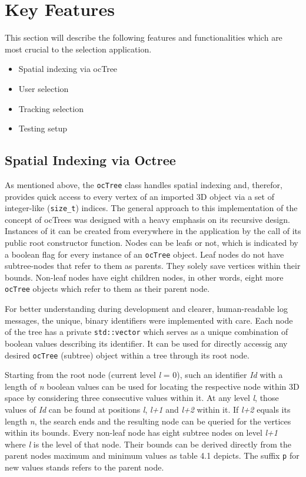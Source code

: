 \section{Key Features}
\label{sec:key_features}
This section will describe the following features and functionalities which are most crucial to the selection application.

\begin{itemize}  
	\item Spatial indexing via ocTree
	\item User selection
	\item Tracking selection
	\item Testing setup 
\end{itemize}

\subsection{Spatial Indexing via Octree}
\label{sec:spatial_indexing_via_octree}

As mentioned above, the \texttt{ocTree} class handles spatial indexing and, therefor, provides quick access to every vertex of an imported 3D object via a set of integer-like (\texttt{size\_t}) indices. The general approach to this implementation of the concept of ocTrees was designed with a heavy emphasis on its recursive design. Instances of it can be created from everywhere in the application by the call of its public root constructor function. Nodes can be leafs or not, which is indicated by a boolean flag for every instance of an \texttt{ocTree} object. Leaf nodes do not have subtree-nodes that refer to them as parents. They solely save vertices within their bounds. Non-leaf nodes have eight children nodes, in other words, eight more \texttt{ocTree} objects which refer to them as their parent node.

For better understanding during development and clearer, human-readable log messages, the unique, binary identifiers were implemented with care. Each node of the tree has a private \texttt{std::vector} which serves as a unique combination of boolean values describing its identifier. It can be used for directly accessig any desired \texttt{ocTree} (subtree) object within a tree through its root node.

Starting from the root node (current level \textit{l} = 0), such an identifier \textit{Id} with a length of \textit{n} boolean values can be used for locating the respective node within 3D space by considering three consecutive values within it. At any level \textit{l}, those  values of \textit{Id} can be found at positions \textit{l}, \textit{l+1} and \textit{l+2} within it. If \textit{l+2} equals its length \textit{n}, the search ends and the resulting node can be queried for the vertices within its bounds. Every non-leaf node has eight subtree nodes on level \textit{l+1} where \textit{l} is the level of that node. Their bounds can be derived directly from the parent nodes maximum and minimum values as table 4.1 depicts. The suffix \texttt{p} for new values stands refers to the parent node.

